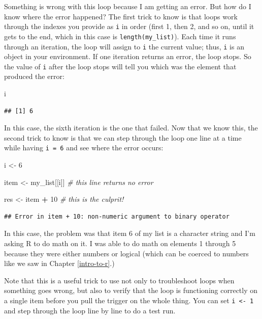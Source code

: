\documentclass[
]{book}
\newenvironment{Shaded}{\begin{snugshade}}{\end{snugshade}}
\newcommand{\CommentTok}[1]{\textcolor[rgb]{0.56,0.35,0.01}{\textit{#1}}}
\newcommand{\DecValTok}[1]{\textcolor[rgb]{0.00,0.00,0.81}{#1}}
\newcommand{\NormalTok}[1]{#1}
\newcommand{\OtherTok}[1]{\textcolor[rgb]{0.56,0.35,0.01}{#1}}
\newcommand{\SpecialCharTok}[1]{\textcolor[rgb]{0.81,0.36,0.00}{\textbf{#1}}}
\begin{document}
Something is wrong with this loop because I am getting an error. But how do I
know where the error happened? The first trick to know is that loops work
through the indexes you provide as \texttt{i} in order (first 1, then 2, and so on,
until it gets to the end, which in this case is \texttt{length(my\_list)}). Each time
it runs through an iteration, the loop will assign to \texttt{i} the current value;
thus, \texttt{i} is an object in your environment. If one iteration returns an error,
the loop stops. So the value of \texttt{i} after the loop stops will tell you which was
the element that produced the error:

\begin{Shaded}
\begin{Highlighting}[]
\NormalTok{i}
\end{Highlighting}
\end{Shaded}

\begin{verbatim}
## [1] 6
\end{verbatim}

In this case, the sixth iteration is the one that failed. Now that we know this,
the second trick to know is that we can step through the loop one line at a time
while having \texttt{i\ =\ 6} and see where the error occurs:

\begin{Shaded}
\begin{Highlighting}[]
\NormalTok{i }\OtherTok{\textless{}{-}} \DecValTok{6}

\NormalTok{item }\OtherTok{\textless{}{-}}\NormalTok{ my\_list[[i]] }\CommentTok{\# this line returns no error}

\NormalTok{res }\OtherTok{\textless{}{-}}\NormalTok{ item }\SpecialCharTok{+} \DecValTok{10} \CommentTok{\# this is the culprit!}
\end{Highlighting}
\end{Shaded}

\begin{verbatim}
## Error in item + 10: non-numeric argument to binary operator
\end{verbatim}

In this case, the problem was that item 6 of my list is a character string and
I'm asking R to do math on it. I was able to do math on elements 1 through 5
because they were either numbers or logical (which can be coerced to numbers
like we saw in Chapter \ref{intro-to-r}.)

Note that this is a useful trick to use not only to troubleshoot loops when
something goes wrong, but also to verify that the loop is functioning correctly
on a single item before you pull the trigger on the whole thing. You can set
\texttt{i\ \textless{}-\ 1} and step through the loop line by line to do a test run.
\end{document}
